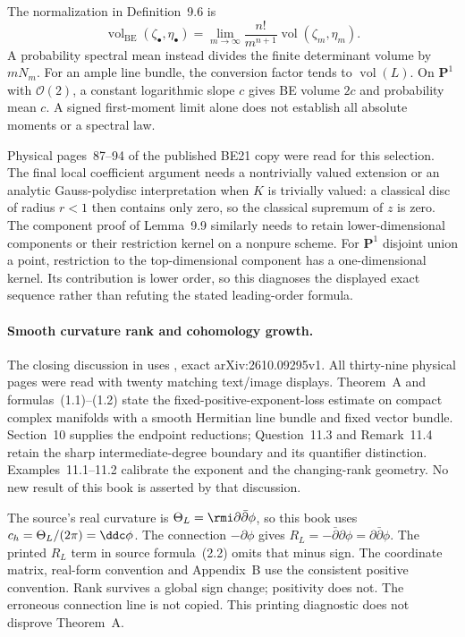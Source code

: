 The normalization in Definition~9.6 is
\[
 \operatorname{vol}_{\mathrm{BE}}(\zeta_\bullet,\eta_\bullet)
   =\lim_{m\to\infty}\frac{n!}{m^{n+1}}
                      \operatorname{vol}(\zeta_m,\eta_m).
\]
A probability spectral mean instead divides the finite
determinant volume by \(mN_m\). For an ample line bundle,
the conversion factor tends to \(\operatorname{vol}(L)\).
On \(\mathbf P^1\) with \(\mathcal O(2)\), a constant
logarithmic slope \(c\) gives BE volume \(2c\) and
probability mean \(c\). A signed first-moment limit alone
does not establish all absolute moments or a spectral law.

Physical pages~87--94 of the published BE21 copy were read
for this selection. The final local coefficient argument
needs a nontrivially valued extension or an analytic
Gauss-polydisc interpretation when \(K\) is trivially valued:
a classical disc of radius \(r<1\) then contains only zero,
so the classical supremum of \(z\) is zero.
The component proof of Lemma~9.9 similarly needs to retain
lower-dimensional components or their restriction kernel
on a nonpure scheme. For \(\mathbf P^1\) disjoint union
a point, restriction to the top-dimensional component has
a one-dimensional kernel. Its contribution is lower order,
so this diagnoses the displayed exact sequence rather than
refuting the stated leading-order formula.

\paragraph{Smooth curvature rank and cohomology growth.}
The closing discussion in
 uses
\cite{Qin26CurvatureRankV1}, exact arXiv:2610.09295v1.
All thirty-nine physical pages were read with twenty matching
text/image displays. Theorem~A and formulas~(1.1)--(1.2) state the
fixed-positive-exponent-loss estimate on compact complex manifolds
with a smooth Hermitian line bundle and fixed vector bundle.
Section~10 supplies the endpoint reductions; Question~11.3 and
Remark~11.4 retain the sharp intermediate-degree boundary and its
quantifier distinction. Examples~11.1--11.2 calibrate the exponent
and the changing-rank geometry. No new result of this book is
asserted by that discussion.

The source's real curvature is \(\Theta_L=\rmi\partial\bar\partial\phi\),
so this book uses \(c_h=\Theta_L/(2\pi)=\ddc\phi\).
The connection \(-\partial\phi\) gives
\(R_L=-\bar\partial\partial\phi=\partial\bar\partial\phi\).
The printed \(R_L\) term in source formula~(2.2) omits that minus
sign. The coordinate matrix, real-form convention and Appendix~B
use the consistent positive convention. Rank survives a global sign
change; positivity does not. The erroneous connection line is not
copied. This printing diagnostic does not disprove Theorem~A.

